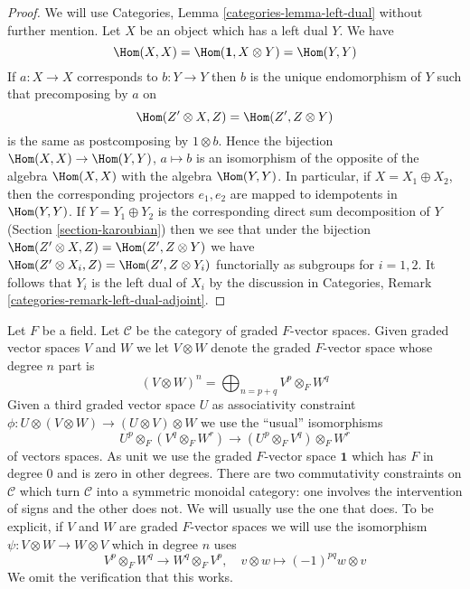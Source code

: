 \begin{proof}
We will use Categories, Lemma \ref{categories-lemma-left-dual}
without further mention.
Let $X$ be an object which has a left dual $Y$. We have
$$
\Hom(X, X) = \Hom(\mathbf{1}, X \otimes Y) = \Hom(Y, Y)
$$
If $a : X \to X$ corresponds to $b : Y \to Y$ then $b$ is the unique
endomorphism of $Y$ such that precomposing by $a$ on
$$
\Hom(Z' \otimes X, Z) = \Hom(Z', Z \otimes Y)
$$
is the same as postcomposing by $1 \otimes b$.
Hence the bijection $\Hom(X, X) \to \Hom(Y, Y)$, $a \mapsto b$
is an isomorphism of the opposite of the algebra $\Hom(X, X)$ with
the algebra $\Hom(Y, Y)$. In particular, if $X = X_1 \oplus X_2$, then
the corresponding projectors $e_1, e_2$ are mapped to idempotents
in $\Hom(Y, Y)$. If $Y = Y_1 \oplus Y_2$ is the corresponding direct
sum decomposition of $Y$ (Section \ref{section-karoubian})
then we see that under the bijection
$\Hom(Z' \otimes X, Z) = \Hom(Z', Z \otimes Y)$
we have $\Hom(Z' \otimes X_i, Z) = \Hom(Z', Z \otimes Y_i)$
functorially as subgroups for $i = 1, 2$.
It follows that $Y_i$ is the left dual of
$X_i$ by the discussion in
Categories, Remark \ref{categories-remark-left-dual-adjoint}.
\end{proof}

\begin{example}
\label{example-graded-vector-spaces}
Let $F$ be a field. Let $\mathcal{C}$ be the category of graded
$F$-vector spaces. Given graded vector spaces $V$ and $W$ we
let $V \otimes W$ denote the graded $F$-vector space whose
degree $n$ part is
$$
(V \otimes W)^n = \bigoplus\nolimits_{n = p + q} V^p \otimes_F W^q
$$
Given a third graded vector space $U$ as associativity constraint
$\phi : U \otimes (V \otimes W) \to (U \otimes V) \otimes W$
we use the ``usual'' isomorphisms
$$
U^p \otimes_F (V^q \otimes_F W^r) \to (U^p \otimes_F V^q) \otimes_F W^r
$$
of vectors spaces. As unit we use the graded $F$-vector space $\mathbf{1}$
which has $F$ in degree $0$ and is zero in other degrees.
There are two commutativity constraints on $\mathcal{C}$
which turn $\mathcal{C}$ into a symmetric monoidal category: one involves the
intervention of signs and the other does not. We will usually
use the one that does. To be explicit, if $V$ and $W$ are graded $F$-vector
spaces we will use the isomorphism $\psi : V \otimes W \to W \otimes V$
which in degree $n$ uses
$$
V^p \otimes_F W^q \to W^q \otimes_F V^p,\quad
v \otimes w \mapsto (-1)^{pq} w \otimes v
$$
We omit the verification that this works.
\end{example}

